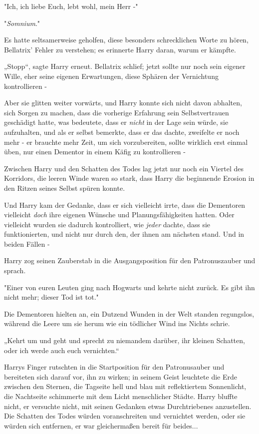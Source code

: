 {"Ich, ich liebe Euch, lebt wohl, mein Herr -"

"\emph{Somnium}."

Es hatte seltsamerweise geholfen, diese besonders schrecklichen Worte zu hören, Bellatrix' Fehler zu verstehen; es erinnerte Harry daran, warum er kämpfte.

„Stopp“, sagte Harry erneut. Bellatrix schlief; jetzt sollte nur noch sein eigener Wille, eher seine eigenen Erwartungen, diese Sphären der Vernichtung kontrollieren -

Aber sie glitten weiter vorwärts, und Harry konnte sich nicht davon abhalten, sich Sorgen zu machen, dass die vorherige Erfahrung sein Selbstvertrauen geschädigt hatte, was bedeutete, dass er \emph{nicht} in der Lage sein würde, sie aufzuhalten, und als er selbst bemerkte, dass er das dachte, zweifelte er noch mehr - er brauchte mehr Zeit, um sich vorzubereiten, sollte wirklich erst einmal üben, nur einen Dementor in einem Käfig zu kontrollieren -

Zwischen Harry und den Schatten des Todes lag jetzt nur noch ein Viertel des Korridors, die leeren Winde waren so stark, dass Harry die beginnende Erosion in den Ritzen seines Selbst spüren konnte.

Und Harry kam der Gedanke, dass er sich vielleicht irrte, dass die Dementoren vielleicht \emph{doch} ihre eigenen Wünsche und Planungsfähigkeiten hatten. Oder vielleicht wurden sie dadurch kontrolliert, wie \emph{jeder} dachte, dass sie funktionierten, und nicht nur durch den, der ihnen am nächsten stand. Und in beiden Fällen -

Harry zog seinen Zauberstab in die Ausgangsposition für den Patronuszauber und sprach.

"Einer von euren Leuten ging nach Hogwarts und kehrte nicht zurück. Es gibt ihn nicht mehr; dieser Tod ist tot."

Die Dementoren hielten an, ein Dutzend Wunden in der Welt standen regungslos, während die Leere um sie herum wie ein tödlicher Wind ins Nichts schrie.

„Kehrt um und geht und sprecht zu niemandem darüber, ihr kleinen Schatten, oder ich werde auch euch vernichten.“

Harrys Finger rutschten in die Startposition für den Patronusauber und bereiteten sich darauf vor, ihn zu wirken; in seinem Geist leuchtete die Erde zwischen den Sternen, die Tagseite hell und blau mit reflektiertem Sonnenlicht, die Nachtseite schimmerte mit dem Licht menschlicher Städte. Harry bluffte nicht, er versuchte nicht, mit seinen Gedanken etwas Durchtriebenes anzustellen. Die Schatten des Todes würden voranschreiten und vernichtet werden, oder sie würden sich entfernen, er war gleichermaßen bereit für beides...

}
